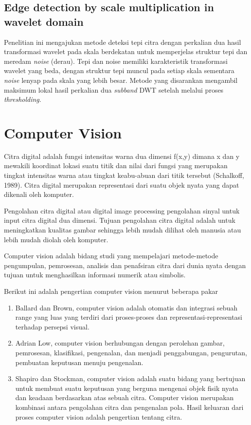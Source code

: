\documentclass[laporan.tex]{subfiles}
\begin{document}
\subsection{Edge detection by scale multiplication in wavelet domain}

Penelitian ini mengajukan metode deteksi tepi citra dengan perkalian dua hasil transformasi wavelet pada skala berdekatan untuk memperjelas struktur tepi dan meredam \emph{noise} (derau). Tepi dan noise memiliki karakteristik transformasi wavelet yang beda, dengan struktur tepi muncul pada setiap skala sementara \emph{noise} lenyap pada skala yang lebih besar. Metode yang disarankan mengambil maksimum lokal hasil perkalian dua \emph{subband} DWT setelah melalui proses \emph{thresholding}.

\section{Computer Vision}

Citra digital adalah fungsi intensitas warna dua dimensi f(x,y) dimana x dan y mewakili koordinat lokasi suatu titik dan nilai dari fungsi yang merupakan tingkat intensitas warna atau tingkat keabu-abuan dari titik tersebut (Schalkoff, 1989). Citra digital merupakan representasi dari suatu objek nyata yang dapat dikenali oleh komputer.

Pengolahan citra digital atau digital image processing pengolahan sinyal untuk input citra digital dua dimensi. Tujuan pengolahan citra digital adalah untuk meningkatkan kualitas gambar sehingga lebih mudah dilihat oleh manusia atau lebih mudah diolah oleh komputer.

Computer vision adalah bidang studi yang mempelajari metode-metode pengumpulan, pemrosesan, analisis dan penafsiran citra dari dunia nyata dengan tujuan untuk menghasilkan informasi numerik atau simbolis.

Berikut ini adalah pengertian computer vision menurut beberapa pakar

\begin{enumerate}
\item Ballard dan Brown, computer vision adalah otomatis dan integrasi sebuah range yang luas yang terdiri dari proses-proses dan representasi-representasi terhadap persepsi visual.
\item Adrian Low, computer vision berhubungan dengan perolehan gambar, pemrosesan, klasifikasi, pengenalan, dan menjadi penggabungan, pengurutan, pembuatan keputusan menuju pengenalan.
\item Shapiro dan Stockman, computer vision adalah suatu bidang yang bertujuan untuk membuat suatu keputusan yang berguna mengenai objek fisik nyata dan keadaan berdasarkan atas sebuah citra. Computer vision merupakan kombinasi antara pengolahan citra dan pengenalan pola. Hasil keluaran dari proses computer vision adalah pengertian tentang citra.
\end{enumerate}
\end{document}

